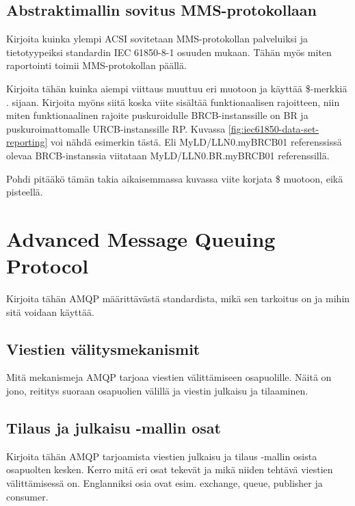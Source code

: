 \subsection{Abstraktimallin sovitus MMS-protokollaan}
\begin{it}
	Kirjoita kuinka ylempi ACSI sovitetaan MMS-protokollan palveluiksi ja tietotyypeiksi standardin IEC 61850-8-1 osuuden mukaan. Tähän myös miten raportointi toimii MMS-protokollan päällä.

	Kirjoita tähän kuinka aiempi viittaus muuttuu eri muotoon ja käyttää \$-merkkiä . sijaan. Kirjoita myöns siitä koska viite sisältää funktionaalisen rajoitteen, niin miten funktionaalinen rajoite puskuroidulle BRCB-instanssille on BR ja puskuroimattomalle URCB-instanssille RP. Kuvassa \ref{fig:iec61850-data-set-reporting} voi nähdä esimerkin tästä. Eli MyLD/LLN0.myBRCB01 referenssissä olevaa BRCB-instanssia viitataan MyLD/LLN0.BR.myBRCB01 referenssillä. \cite[s.~75]{IEC61850-8-1}

	Pohdi pitääkö tämän takia aikaisemmassa kuvassa viite korjata \$ muotoon, eikä pisteellä.
\end{it}


\section{Advanced Message Queuing Protocol}
\begin{it}
	Kirjoita tähän AMQP määrittävästä standardista, mikä sen tarkoitus on ja mihin sitä voidaan käyttää.
\end{it}


\subsection{Viestien välitysmekanismit}
\begin{it}
	Mitä mekanismeja AMQP tarjoaa viestien välittämiseen osapuolille. Näitä on jono, reititys suoraan osapuolien välillä ja viestin julkaisu ja tilaaminen.
\end{it}


\subsection{Tilaus ja julkaisu -mallin osat}
\begin{it}
	Kirjoita tähän AMQP tarjoamista viestien julkaisu ja tilaus -mallin osista osapuolten kesken. Kerro mitä eri osat tekevät ja mikä niiden tehtävä viestien välittämisessä on. Englanniksi osia ovat esim. exchange, queue, publisher ja consumer.
\end{it}